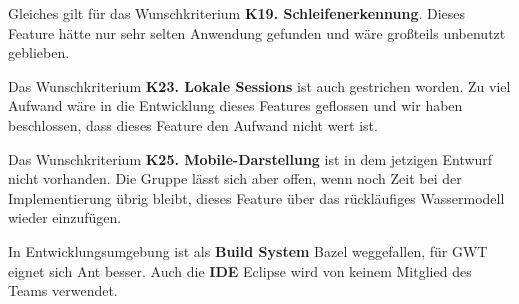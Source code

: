 \documentclass[parskip=full,11pt,twoside]{scrbook}
\begin{document}
Gleiches gilt für das Wunschkriterium \textbf{K19. Schleifenerkennung}. Dieses Feature hätte nur sehr selten Anwendung gefunden und wäre großteils unbenutzt geblieben.

Das Wunschkriterium \textbf{K23. Lokale Sessions} ist auch gestrichen worden. Zu viel Aufwand wäre in die Entwicklung dieses Features geflossen und wir haben beschlossen, dass dieses Feature den Aufwand nicht wert ist.

Das Wunschkriterium \textbf{K25. Mobile-Darstellung} ist in dem jetzigen Entwurf nicht vorhanden. Die Gruppe lässt sich aber offen, wenn noch Zeit bei der Implementierung übrig bleibt, dieses Feature über das rückläufiges Wassermodell wieder einzufügen.

In Entwicklungsumgebung ist als \textbf{Build System} Bazel weggefallen, für GWT eignet sich Ant besser.
Auch die \textbf{IDE} Eclipse wird von keinem Mitglied des Teams verwendet.
\end{document}
